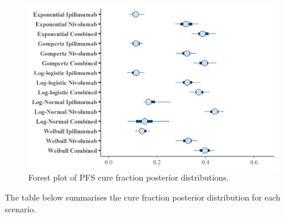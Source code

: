 \documentclass[
]{article}
\begin{document}
\begin{figure}

{\centering \includegraphics[width=0.6\linewidth]{../plots/cf_pfs_forest_plot} 

}

\caption{\label{fig:forest_pfs}Forest plot of PFS cure fraction posterior distributions.}\label{fig:unnamed-chunk-8}
\end{figure}

The table below summarises the cure fraction posterior distribution for
each scenario.
\end{document}

